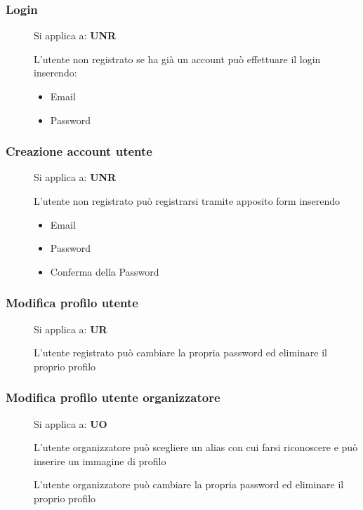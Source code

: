 \documentclass{article}
\begin{document}
\subsubsection{Login} \label{rf_8}
\begin{description}
    \item[] Si applica a: \textbf{UNR}
    \item[] L'utente non registrato se ha già un account può effettuare il login inserendo:
        \begin{itemize}
            \item Email
            \item Password
        \end{itemize}
\end{description}
\subsubsection{Creazione account utente} \label{rf_9}
\begin{description}
    \item[] Si applica a: \textbf{UNR}
    \item[] L'utente non registrato può registrarsi tramite apposito form inserendo
        \begin{itemize}
            \item Email
            \item Password
            \item Conferma della Password
        \end{itemize}
\end{description}
\subsubsection{Modifica profilo utente} \label{rf_10}
\begin{description}
    \item[] Si applica a: \textbf{UR}
    \item[] L'utente registrato può cambiare la propria password ed eliminare il proprio profilo
\end{description}
\subsubsection{Modifica profilo utente organizzatore} \label{rf_11}
\begin{description}
    \item[] Si applica a: \textbf{UO}
    \item[] L'utente organizzatore può scegliere un alias con cui farsi riconoscere e può inserire un immagine di profilo
    \item[] L'utente organizzatore può cambiare la propria password ed eliminare il proprio profilo
\end{description}
\end{document}
